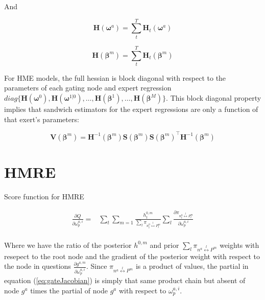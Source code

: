 \documentclass[12pt]{article}
\newcommand{\Ht}[1]{\mathbf{H}_{t}(#1)}
\newcommand{\HH}[1]{\boldsymbol{H}(#1)}
\newcommand{\HI}[1]{\boldsymbol{H}^{-1}(#1)}
\begin{document}
And

\begin{equation}
  \HH{\boldsymbol{\omega}^{a}} = \sum_{t}^{T} \Ht{\boldsymbol{\omega}^{a}}
\end{equation}

\begin{equation}
  \HH{\boldsymbol{\beta}^{m}} = \sum_{t}^{T} \Ht{\boldsymbol{\beta}^{m}}
\end{equation}

For HME models, the full hessian is block diagonal with respect to the parameters of 
each gating node and expert regression $diag \{ \HH{\boldsymbol{\omega}^{0}}, \HH{\boldsymbol{\omega}^{1|0}}, \ldots, \HH{\boldsymbol{\beta}^{1}}, \ldots, \HH{\boldsymbol{\beta}^{M}} \}$.
This block diagonal property implies that sandwich estimators for the expert
regressions are only a function of that exert's parameters:

\begin{equation}
  \boldsymbol{V}(\boldsymbol{\beta}^{m}) = \HI{\boldsymbol{\beta}^{m}} \boldsymbol{S}(\boldsymbol{\beta}^{m}) \boldsymbol{S}(\boldsymbol{\beta}^{m})^\top \HI{\boldsymbol{\beta}^{m}}
\end{equation}

\section{HMRE}


Score function for HMRE

\begin{equation} \label{eq:gateJacobian}
  \begin{split}
    \frac{\partial Q}{\partial \omega^{a,i}_{p}} =& \sum_{t} \sum_{m=1}  \frac{h^{0,m}_{t}}{\sum_{l} \pi_{n^{0}_{t} \overset{l}{\longleftrightarrow} P^{m}_{t}}} \sum_{l} \frac{\partial \pi_{n^{0}_{t} \overset{l}{\longleftrightarrow} P^{m}_{t}}}{\partial \omega^{a,i}_{p}} \\
  \end{split}
\end{equation}

Where we have the ratio of the posterior $h^{0,m}$ and prior 
$\sum_{l} \pi_{n^{a} \overset{l}{\longleftrightarrow} P^{m}}$ weights with resepect
to the root node and the gradient of the posterior weight with respect to the node
in questions $\frac{\partial g^{a,m}}{\partial \omega^{a,i}_{p}}$. Since
$\pi_{n^{a} \overset{l}{\longleftrightarrow} P^{m}}$ is a product of values, the
partial in equation (\ref{eq:gateJacobian}) is simply that same product chain but
absent of node $g^a$ times the partial of node $g^a$ with respect to
$\omega^{a,i}_{p}$.
\end{document}
